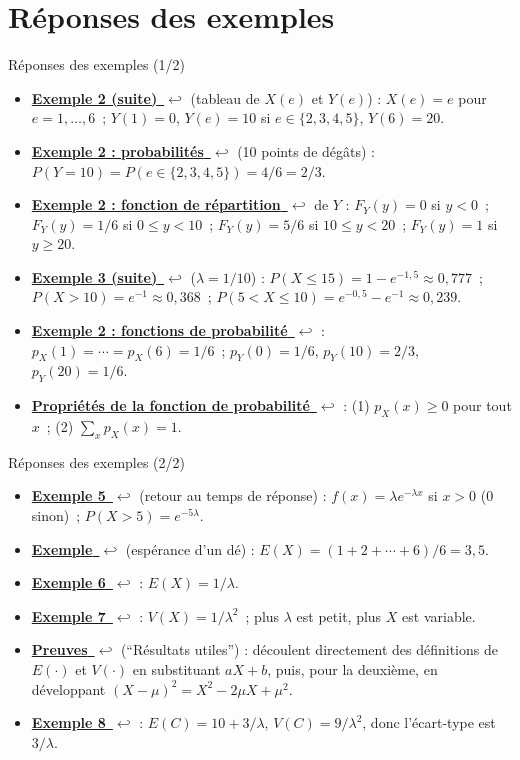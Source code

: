 \documentclass{BeamerTemplate}
\newcommand{\retour}[2]{\hyperlink{#1}{\textbf{#2}~{\color{gray}$\hookleftarrow$}}}
\begin{document}
\section{Réponses des exemples}

\begin{frame}[t,label=rep-ex1]{Réponses des exemples (1/2)}
\footnotesize
\begin{itemize}
\item \retour{ex2tab}{Exemple 2 (suite)} (tableau de $X(e)$ et $Y(e)$) : $X(e)=e$ pour $e=1,\ldots,6$~;
$Y(1)=0$, $Y(e)=10$ si $e\in\{2,3,4,5\}$, $Y(6)=20$.
\item \retour{ex2prob}{Exemple 2 : probabilités} (10 points de dégâts) : $P(Y=10)=P(e\in\{2,3,4,5\})=4/6=2/3$.
\item \retour{ex2rep}{Exemple 2 : fonction de répartition} de $Y$ : $F_Y(y)=0$ si $y<0$~;
$F_Y(y)=1/6$ si $0\le y<10$~; $F_Y(y)=5/6$ si $10\le y<20$~; $F_Y(y)=1$ si $y\ge20$.
\item \retour{ex3}{Exemple 3 (suite)} ($\lambda=1/10$) : $P(X\le15)=1-e^{-1{,}5}\approx0{,}777$~;
$P(X>10)=e^{-1}\approx0{,}368$~; $P(5<X\le10)=e^{-0{,}5}-e^{-1}\approx0{,}239$.
\item \retour{ex2pmf}{Exemple 2 : fonctions de probabilité} : $p_X(1)=\cdots=p_X(6)=1/6$~; $p_Y(0)=1/6$, $p_Y(10)=2/3$, $p_Y(20)=1/6$.
\item \retour{proppmf}{Propriétés de la fonction de probabilité} : (1) $p_X(x)\ge 0$ pour tout $x$~; (2) $\sum_x p_X(x)=1$.
\end{itemize}

\end{frame}

\begin{frame}[t,label=rep-ex2]{Réponses des exemples (2/2)}
\footnotesize
\begin{itemize}
\item \retour{ex5}{Exemple 5} (retour au temps de réponse) : $f(x)=\lambda e^{-\lambda x}$ si $x>0$ (0 sinon)~;
$P(X>5)=e^{-5\lambda}$.
\item \retour{exde}{Exemple} (espérance d'un dé) : $E(X)=(1+2+\cdots+6)/6=3{,}5$.
\item \retour{ex6}{Exemple 6} : $E(X)=1/\lambda$.
\item \retour{ex7}{Exemple 7} : $V(X)=1/\lambda^2$~; plus $\lambda$ est petit, plus $X$ est variable.
\item \retour{preuve1}{Preuves} (\enquote{Résultats utiles}) : découlent directement des définitions de $E(\cdot)$ et $V(\cdot)$ en substituant $aX+b$, puis, pour la deuxième, en développant $(X-\mu)^2=X^2-2\mu X+\mu^2$.
\item \retour{ex8}{Exemple 8} : $E(C)=10+3/\lambda$, $V(C)=9/\lambda^2$, donc l'écart-type est $3/\lambda$.
\end{itemize}

\end{frame}
\end{document}

